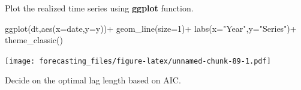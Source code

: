 \documentclass[
  12pt,
  oneside]{book}
\newenvironment{Shaded}{\begin{snugshade}}{\end{snugshade}}
\newcommand{\AttributeTok}[1]{\textcolor[rgb]{0.77,0.63,0.00}{#1}}
\newcommand{\DecValTok}[1]{\textcolor[rgb]{0.00,0.00,0.81}{#1}}
\newcommand{\FunctionTok}[1]{\textcolor[rgb]{0.00,0.00,0.00}{#1}}
\newcommand{\NormalTok}[1]{#1}
\newcommand{\SpecialCharTok}[1]{\textcolor[rgb]{0.00,0.00,0.00}{#1}}
\newcommand{\StringTok}[1]{\textcolor[rgb]{0.31,0.60,0.02}{#1}}
\begin{document}
Plot the realized time series using \textbf{ggplot} function.

\begin{Shaded}
\begin{Highlighting}[]
\FunctionTok{ggplot}\NormalTok{(dt,}\FunctionTok{aes}\NormalTok{(}\AttributeTok{x=}\NormalTok{date,}\AttributeTok{y=}\NormalTok{y))}\SpecialCharTok{+}
  \FunctionTok{geom\_line}\NormalTok{(}\AttributeTok{size=}\DecValTok{1}\NormalTok{)}\SpecialCharTok{+}
  \FunctionTok{labs}\NormalTok{(}\AttributeTok{x=}\StringTok{"Year"}\NormalTok{,}\AttributeTok{y=}\StringTok{"Series"}\NormalTok{)}\SpecialCharTok{+}
  \FunctionTok{theme\_classic}\NormalTok{()}
\end{Highlighting}
\end{Shaded}

\texttt{[image: forecasting\_files/figure-latex/unnamed-chunk-89-1.pdf]}

Decide on the optimal lag length based on AIC.
\end{document}

